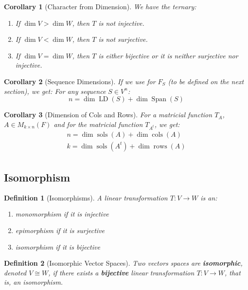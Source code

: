 \documentclass[12pt]{article}
\DeclareMathOperator{\Span}{Span}
\DeclareMathOperator{\sols}{sols}
\DeclareMathOperator{\LD}{LD}
\DeclareMathOperator{\cols}{cols}
\DeclareMathOperator{\rows}{rows}
\newtheorem{definition}{Definition}[subsection]
\newtheorem{corollary}{Corollary}[subsection]
\begin{document}
\begin{corollary}[Character from Dimension]
  We have the ternary:
  \begin{enumerate}
    \item If $\dim V>\dim W$, then $T$ is not injective.
    \item If $\dim V<\dim W$, then $T$ is not surjective.
    \item If $\dim V=\dim W$, then $T$ is either bijective or it is neither surjective nor injective.
  \end{enumerate}
\end{corollary}

\begin{corollary}[Sequence Dimensions]
  If we use for $F_S$ (to be defined on the next section), we get: For any sequence $S\in V^n$:
  $$n=\dim\LD(S)+\dim\Span(S)$$
\end{corollary}

\begin{corollary}[Dimension of Cols and Rows]
  For a matricial function $T_A$, $A\in M_{k\times n}(F)$ and for the matricial function $T_{A^t}$, we get:
  \begin{align*}
    n=\dim\sols(A)+\dim\cols(A)\\
    k=\dim\sols(A^t)+\dim\rows(A)\\
  \end{align*}
\end{corollary}

\subsection{Isomorphism}

\begin{definition}[Isomorphisms]
  A linear transformation $T: V\to W$ is an:
  \begin{enumerate}
    \item monomorphism if it is injective
    \item epimorphism if it is surjective
    \item isomorphism if it is bijective
  \end{enumerate}
\end{definition}

\begin{definition}[Isomorphic Vector Spaces]
  Two vectors spaces are \textbf{isomorphic}, denoted $V\cong W$, if there exists a \textbf{bijective} linear transformation $T: V\to W$, that is, an isomorphism.
\end{definition}
\end{document}
